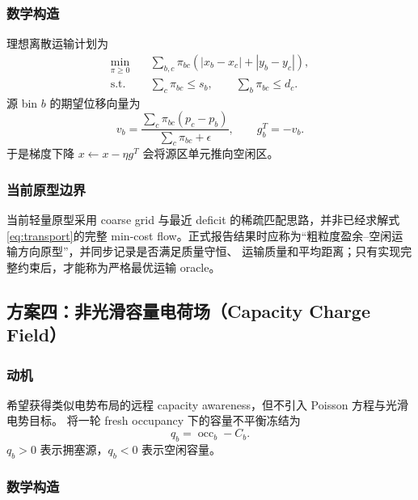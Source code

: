 \documentclass[UTF8,a4paper,11pt]{ctexart}
\begin{document}
\subsubsection{数学构造}

理想离散运输计划为
\begin{equation}
\begin{aligned}
  \min_{\pi\ge0}\quad &\sum_{b,c}\pi_{bc}
  \left(|x_b-x_c|+|y_b-y_c|\right),\\
  \text{s.t.}\quad &\sum_c\pi_{bc}\le s_b,
  \qquad
  \sum_b\pi_{bc}\le d_c.
\end{aligned}
\label{eq:transport}
\end{equation}
源 bin $b$ 的期望位移向量为
\begin{equation}
  v_b=\frac{\sum_c\pi_{bc}(p_c-p_b)}
  {\sum_c\pi_{bc}+\epsilon},
  \qquad g_b^{T}=-v_b.
  \label{eq:transport-direction}
\end{equation}
于是梯度下降 $x\leftarrow x-\eta g^T$ 会将源区单元推向空闲区。

\subsubsection{当前原型边界}

当前轻量原型采用 coarse grid 与最近 deficit 的稀疏匹配思路，并非已经求解式\eqref{eq:transport}的完整
min-cost flow。正式报告结果时应称为“粗粒度盈余--空闲运输方向原型”，并同步记录是否满足质量守恒、
运输质量和平均距离；只有实现完整约束后，才能称为严格最优运输 oracle。

\subsection{方案四：非光滑容量电荷场（Capacity Charge Field）}

\subsubsection{动机}

希望获得类似电势布局的远程 capacity awareness，但不引入 Poisson 方程与光滑电势目标。
将一轮 fresh occupancy 下的容量不平衡冻结为
\begin{equation}
  q_b=\operatorname{occ}_b-C_b.
  \label{eq:charge}
\end{equation}
$q_b>0$ 表示拥塞源，$q_b<0$ 表示空闲容量。

\subsubsection{数学构造}
\end{document}
